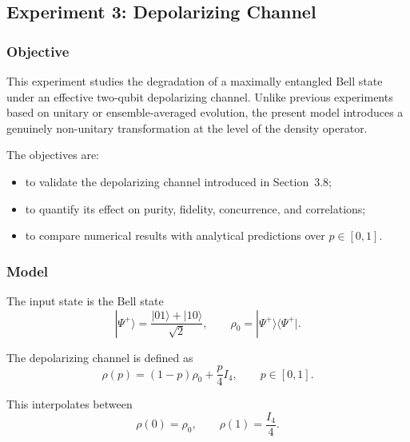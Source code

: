 \documentclass[a4paper]{article}
\begin{document}

\subsection{Experiment 3: Depolarizing Channel}


\subsubsection{Objective}

This experiment studies the degradation of a maximally entangled Bell state under an effective two-qubit depolarizing channel. Unlike previous experiments based on unitary or ensemble-averaged evolution, the present model introduces a genuinely non-unitary transformation at the level of the density operator.

The objectives are:
\begin{itemize}
\item to validate the depolarizing channel introduced in Section~3.8;
\item to quantify its effect on purity, fidelity, concurrence, and correlations;
\item to compare numerical results with analytical predictions over \(p \in [0,1]\).
\end{itemize}


\subsubsection{Model}

The input state is the Bell state
\[
|\Psi^+\rangle = \frac{|01\rangle + |10\rangle}{\sqrt{2}},
\qquad
\rho_0 = |\Psi^+\rangle\langle\Psi^+|.
\]

The depolarizing channel is defined as
\[
\rho(p) = (1-p)\rho_0 + \frac{p}{4}I_4,
\qquad p \in [0,1].
\]

This interpolates between
\[
\rho(0)=\rho_0,
\qquad
\rho(1)=\frac{I_4}{4}.
\]

\end{document}
